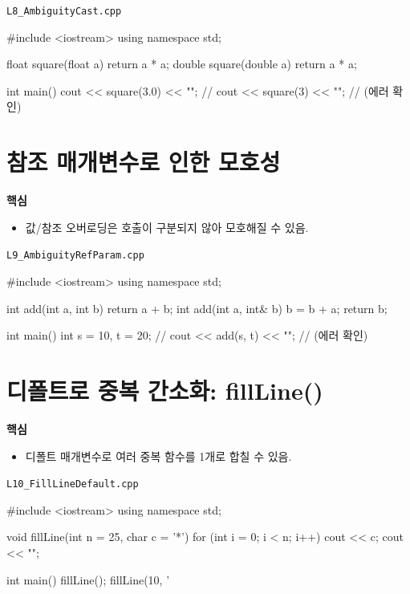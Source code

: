 \documentclass[11pt,a4paper]{article}
\newcommand{\filetag}[1]{\texttt{\color{Accent}#1}}
\begin{document}
\noindent\filetag{L8\_AmbiguityCast.cpp}
\begin{cppcode}
#include <iostream>
using namespace std;

float square(float a) { return a * a; }
double square(double a) { return a * a; }

int main() {
    cout << square(3.0) << "\n";
    // cout << square(3) << "\n"; // (에러 확인)
}
\end{cppcode}

\section{참조 매개변수로 인한 모호성}
\begin{GoalBox}
\textbf{핵심}
\begin{itemize}[leftmargin=18pt]
  \item 값/참조 오버로딩은 호출이 구분되지 않아 모호해질 수 있음.
\end{itemize}
\end{GoalBox}

\noindent\filetag{L9\_AmbiguityRefParam.cpp}
\begin{cppcode}
#include <iostream>
using namespace std;

int add(int a, int b) { return a + b; }
int add(int a, int& b) { b = b + a; return b; }

int main() {
    int s = 10, t = 20;
    // cout << add(s, t) << "\n"; // (에러 확인)
}
\end{cppcode}

\section{디폴트로 중복 간소화: fillLine()}
\begin{GoalBox}
\textbf{핵심}
\begin{itemize}[leftmargin=18pt]
  \item 디폴트 매개변수로 여러 중복 함수를 1개로 합칠 수 있음.
\end{itemize}
\end{GoalBox}

\noindent\filetag{L10\_FillLineDefault.cpp}
\begin{cppcode}
#include <iostream>
using namespace std;

void fillLine(int n = 25, char c = '*') {
    for (int i = 0; i < n; i++) cout << c;
    cout << "\n";
}

int main() {
    fillLine();
    fillLine(10, '%
}
\end{cppcode}
\end{document}
